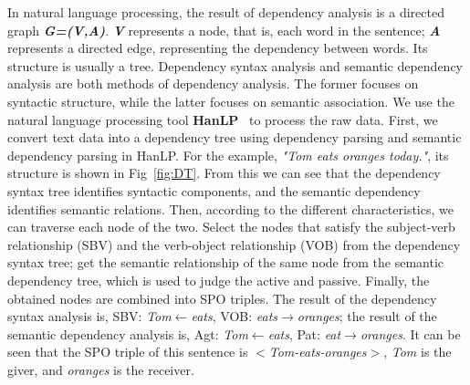 In natural language processing, the result of dependency analysis is a directed graph \textit{\textbf{G=(V,A)}}. \textit{\textbf{V}} represents a node, that is, each word in the sentence; \textit{\textbf{A}} represents a directed edge, representing the dependency between words. Its structure is usually a tree. Dependency syntax analysis and semantic dependency analysis are both methods of dependency analysis. The former focuses on syntactic structure, while the latter focuses on semantic association. We use the natural language processing tool \textbf{HanLP}~\cite{noauthor_hanlp_nodate} to process the raw data. First, we convert text data into a dependency tree using dependency parsing and semantic dependency parsing in HanLP. For the example,  \textit{"Tom eats oranges today."}, its structure is shown in Fig~\ref{fig:DT}. From this we can see that the dependency syntax tree identifies syntactic components, and the semantic dependency identifies semantic relations. Then, according to the different characteristics, we can traverse each node of the two. Select the nodes that satisfy the subject-verb relationship (SBV) and the verb-object relationship (VOB) from the dependency syntax tree; get the semantic relationship of the same node from the semantic dependency tree, which is used to judge the active and passive. Finally, the obtained nodes are combined into SPO triples. The result of the dependency syntax analysis is, SBV: \textit{Tom$\gets$eats}, VOB: \textit{eats$\to$oranges}; the result of the semantic dependency analysis is, Agt: \textit{Tom$\gets$eats}, Pat: \textit{eat$\to$oranges}. It can be seen that the SPO triple of this sentence is $<$\textit{Tom-eats-oranges}$>$, \textit{Tom} is the giver, and \textit{oranges} is the receiver.
 
